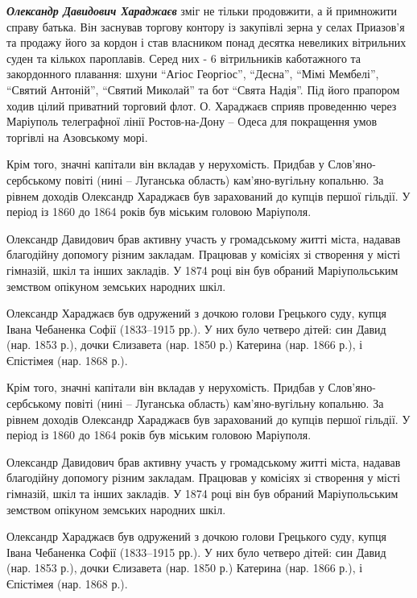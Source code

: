 
\emph{\textbf{Олександр Давидович Хараджаєв}} зміг не тільки продовжити, а й примножити справу
батька.  Він заснував торгову контору із закупівлі зерна у селах Приазов'я та
продажу його за кордон і став власником понад десятка невеликих вітрильних
суден та кількох пароплавів. Серед них - 6 вітрильників каботажного та
закордонного плавання: шхуни \enquote{Агіос Георгіос}, \enquote{Десна}, \enquote{Мімі Мембелі}, \enquote{Святий
Антоній}, \enquote{Святий Миколай} та бот \enquote{Свята Надія}. Під його прапором ходив цілий
приватний торговий флот. О. Хараджаєв сприяв проведенню через Маріуполь
телеграфної лінії Ростов-на-Дону – Одеса для покращення умов торгівлі на
Азовському морі.

Крім того, значні капітали він вкладав у нерухомість. Придбав у
Слов'яно-сербському повіті (нині – Луганська область) кам'яно\hyp{}вугільну копальню.
За рівнем доходів Олександр Хараджаєв був зарахований до купців першої гільдії.
У період із 1860 до 1864 років був міським головою Маріуполя.

Олександр Давидович брав активну участь у громадському житті міста, надавав
благодійну допомогу різним закладам. Працював у комісіях зі створення у місті
гімназій, шкіл та інших закладів. У 1874 році він був обраний Маріупольським
земством опікуном земських народних шкіл.

Олександр Хараджаєв був одружений з дочкою голови Грецького суду, купця Івана
Чебаненка Софії (1833–1915 рр.). У них було четверо дітей: син Давид (нар. 1853
р.), дочки Єлизавета (нар. 1850 р.) Катерина (нар. 1866 р.), і Єпістімея (нар.
1868 р.).

Крім того, значні капітали він вкладав у нерухомість. Придбав у
Слов'яно-сербському повіті (нині – Луганська область) кам'яно\hyp{}вугільну копальню.
За рівнем доходів Олександр Хараджаєв був зарахований до купців першої гільдії.
У період із 1860 до 1864 років був міським головою Маріуполя.

Олександр Давидович брав активну участь у громадському житті міста, надавав
благодійну допомогу різним закладам. Працював у комісіях зі створення у місті
гімназій, шкіл та інших закладів. У 1874 році він був обраний Маріупольським
земством опікуном земських народних шкіл.

Олександр Хараджаєв був одружений з дочкою голови Грецького суду, купця Івана
Чебаненка Софії (1833–1915 рр.). У них було четверо дітей: син Давид (нар. 1853
р.), дочки Єлизавета (нар. 1850 р.) Катерина (нар. 1866 р.), і Єпістімея (нар.
1868 р.).

